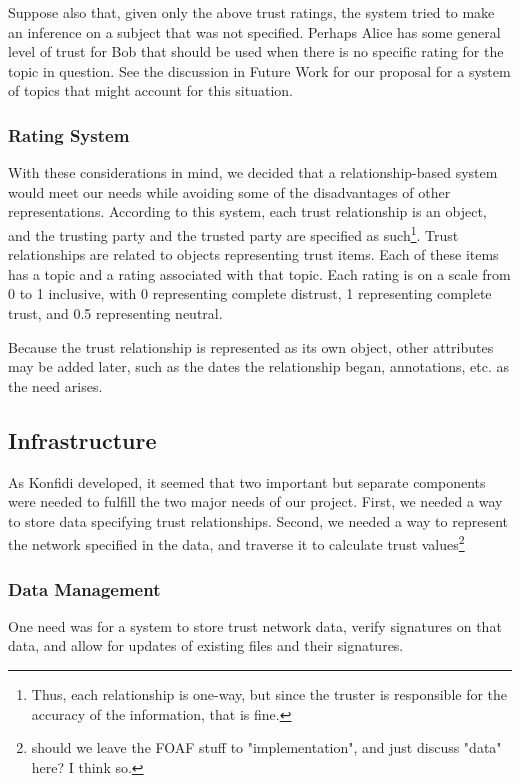 \documentclass{acm_proc_article-sp}
\begin{document}
Suppose also that, given only the above trust ratings, the system tried to make an inference on a subject that was not specified.  Perhaps Alice has some general level of trust for Bob that should be used when there is no specific rating for the topic in question.  See the discussion in Future Work for our proposal for a system of topics that might account for this situation.

\subsubsection{Rating System}
With these considerations in mind, we decided that a relationship-based system would meet our needs while avoiding some of the disadvantages of other representations.  According to this system, each trust relationship is an object, and the trusting party and the trusted party are specified as such\footnote{Thus, each relationship is one-way, but since the truster is responsible for the accuracy of the information, that is fine.}.  Trust relationships are related to objects representing trust items.  Each of these items has a topic and a rating associated with that topic.  Each rating is on a scale from 0 to 1 inclusive, with 0 representing complete distrust, 1 representing complete trust, and 0.5 representing neutral.

Because the trust relationship is represented as its own object, other attributes may be added later, such as the dates the relationship began, annotations, etc. as the need arises.

\subsection{Infrastructure}
As Konfidi developed, it seemed that two important but separate components were needed to fulfill the two major needs of our project.  First, we needed a way to store data specifying trust relationships.  Second, we needed a way to represent the network specified in the data, and traverse it to calculate trust values\footnote{should we leave the FOAF stuff to "implementation", and just discuss "data" here?  I think so.}

\subsubsection{Data Management}
One need was for a system to store trust network data, verify signatures on that data, and allow for updates of existing files and their signatures.
\end{document}
